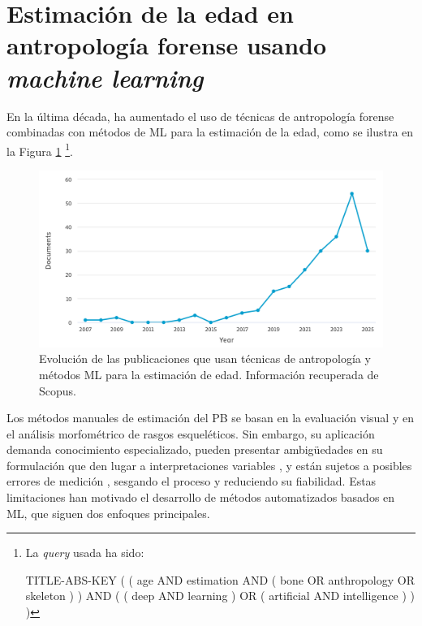 
\section{Estimación de la edad en antropología forense usando \textit{machine learning}}

En la última década, ha aumentado el uso de técnicas de antropología forense combinadas con métodos de ML para la estimación de la edad, como se ilustra en la Figura \ref{fig:num_papers_2}%
\footnote{
    La \textit{query} usada ha sido:
    
    TITLE-ABS-KEY ( ( age AND estimation AND ( bone OR anthropology OR skeleton ) ) AND ( ( deep AND learning ) OR ( artificial AND intelligence ) ) )
}.

\begin{figure}[htbp]
    \centering
    \includegraphics[width=\textwidth]{capitulos/cap_03/imagenes/num_papers_2.png}
    \caption[
        Evolución de las publicaciones que usan técnicas de antropología y métodos ML para la estimación de edad. 
    ]{
        Evolución de las publicaciones que usan técnicas de antropología y métodos ML para la estimación de edad. 
        Información recuperada de Scopus.
    }
    \label{fig:num_papers_2}
\end{figure}

Los métodos manuales de estimación del PB se basan en la evaluación visual y en el análisis morfométrico de rasgos esqueléticos. Sin embargo, su aplicación demanda conocimiento especializado, pueden presentar ambigüedades en su formulación que den lugar a interpretaciones variables \cite{berst2001}, y están sujetos a posibles errores de medición \cite{langley2018}, sesgando el proceso y reduciendo su fiabilidad. Estas limitaciones han motivado el desarrollo de métodos automatizados basados en ML, que siguen dos enfoques principales. 

